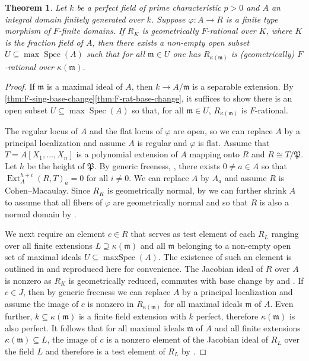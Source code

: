 \documentclass[reqno,11pt]{amsart}
\numberwithin{equation}{section}
\newtheorem{theorem}{Theorem}[section]
\theoremstyle{definition}
\theoremstyle{definition}
\theoremstyle{definition}
\theoremstyle{remark}
\newcommand{\Spec}{\operatorname{Spec}}
\newcommand{\maxSpec}{\operatorname{maxSpec}}
\newcommand{\Ext}{\operatorname{Ext}}
\newcommand{\fm}{\mathfrak{m}}
\newcommand{\fP}{\mathfrak{P}}
\begin{document}
\begin{theorem}
    \label{theorem:A2}
   Let $k$ be a perfect field of prime characteristic $p>0$ and $A$ an integral domain finitely generated over $k$. Suppose $\varphi\colon A\to R$ is a finite type morphism of $F$-finite domains. If $R_K$ is geometrically $F$-rational over $K$, where $K$ is the fraction field of $A$, then there exists a non-empty open subset $U\subseteq \max\Spec(A)$ such that for all $\fm\in U$ one has $R_{\kappa(\fm)}$ is (geometrically) $F$-rational over $\kappa(\fm)$.
\end{theorem}
\begin{proof}
    If $\fm$ is a maximal ideal of $A$, then $k\to A/\fm$ is a separable extension. By \cref{thm:F-sing-base-change}\ref{thm:F-rat-base-change}, it suffices to show there is an open subset $U\subseteq \max\Spec(A)$ so that, for all $\fm\in U$, $R_{\kappa(\fm)}$ is $F$-rational. 
    
    
    The regular locus of $A$ and the flat locus of $\varphi$ are open, so we can replace $A$ by a principal localization and assume $A$ is regular and $\varphi$ is flat. Assume that $T = A[X_1,\ldots, X_n]$ is a polynomial extension of $A$ mapping onto $R$ and $R\cong T/\fP$. Let $h$ be the height of $\fP$. By generic freeness, \cite[\href{https://stacks.math.columbia.edu/tag/051S}{Tag 051S}]{stacks-project}, there exists $0\not = a\in A$ so that $\Ext_A^{h+i}(R, T)_a = 0$ for all $i\ne 0$. We can replace $A$ by $A_{a}$ and assume $R$ is Cohen--Macaulay. Since $R_K$ is geometrically normal, by \cite[Corollaire 9.9.5]{EGA} we can further shrink $A$ to assume that all fibers of $\varphi$ are geometrically normal and so that $R$ is also a normal domain by \cite[Theorem 23.9]{Mat86}. 

    We next require an element $c\in R$ that serves as test element of each $R_{L}$ ranging over all finite extensions $L\supseteq \kappa(\fm)$ and all $\fm$ belonging to a non-empty open set of maximal ideals $U\subseteq \maxSpec(A)$. The existence of such an element is outlined in \cite[Section~5.2]{PSZ18} and reproduced here for convenience. The Jacobian ideal of $R$ over $A$ is nonzero as $R_K$ is geometrically reduced, commutes with base change by \cite[Discussion~4.4.7]{SH06} and \cite[Proposition~16.4]{Eis95}. If $c\in J$, then by generic freeness we can replace $A$ by a principal localization and assume the image of $c$ is nonzero in $R_{\kappa(\fm)}$ for all maximal ideals $\fm$ of $A$. Even further, $k\subseteq \kappa(\fm)$ is a finite field extension with $k$ perfect, therefore $\kappa(\fm)$ is also perfect. It follows that for all maximal ideals $\fm$ of $A$ and all finite extensions $\kappa(\fm)\subseteq L$, the image of $c$ is a nonzero element of the Jacobian ideal of $R_{L}$ over the field $L$ and therefore is a test element of $R_{L}$ by \cite[Theorem on Page 217]{Hoc07}.



\end{proof}
\end{document}

